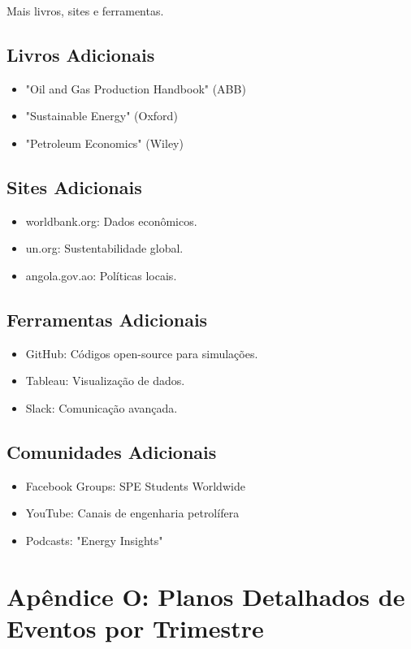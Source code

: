 \documentclass[12pt]{article}
\begin{document}
Mais livros, sites e ferramentas.

\subsection{Livros Adicionais}
\begin{itemize}
    \item "Oil and Gas Production Handbook" (ABB)
    \item "Sustainable Energy" (Oxford)
    \item "Petroleum Economics" (Wiley)
\end{itemize}

\subsection{Sites Adicionais}
\begin{itemize}
    \item worldbank.org: Dados econômicos.
    \item un.org: Sustentabilidade global.
    \item angola.gov.ao: Políticas locais.
\end{itemize}

\subsection{Ferramentas Adicionais}
\begin{itemize}
    \item GitHub: Códigos open-source para simulações.
    \item Tableau: Visualização de dados.
    \item Slack: Comunicação avançada.
\end{itemize}

\subsection{Comunidades Adicionais}
\begin{itemize}
    \item Facebook Groups: SPE Students Worldwide
    \item YouTube: Canais de engenharia petrolífera
    \item Podcasts: "Energy Insights"
\end{itemize}

\clearpage
\section{Apêndice O: Planos Detalhados de Eventos por Trimestre}
\end{document}
